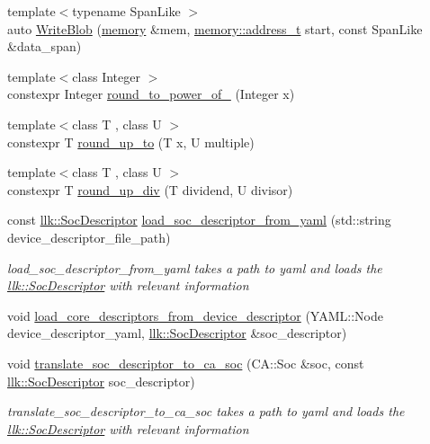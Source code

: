 \begin{DoxyCompactItemize}
\item 
{\footnotesize template$<$typename Span\+Like $>$ }\\auto \hyperlink{namespacellk_a03eaff131f928d8e762175c51ced8fb9}{Write\+Blob} (\hyperlink{classllk_1_1memory}{memory} \&mem, \hyperlink{classllk_1_1memory_ae7a4b897aa999f22e250dc8e4d773dec}{memory\+::address\+\_\+t} start, const Span\+Like \&data\+\_\+span)
\item 
{\footnotesize template$<$class Integer $>$ }\\constexpr Integer \hyperlink{namespacellk_a8cd09709764d84271aa30cbbdbc8c7dd}{round\+\_\+to\+\_\+power\+\_\+of\+\_} (Integer x)
\item 
{\footnotesize template$<$class T , class U $>$ }\\constexpr T \hyperlink{namespacellk_a4d91d6fe231ded1b2eb55d3b804b5da1}{round\+\_\+up\+\_\+to} (T x, U multiple)
\item 
{\footnotesize template$<$class T , class U $>$ }\\constexpr T \hyperlink{namespacellk_a3556f6edf607e08801e2cba0f809d09d}{round\+\_\+up\+\_\+div} (T dividend, U divisor)
\item 
const \hyperlink{structllk_1_1SocDescriptor}{llk\+::\+Soc\+Descriptor} \hyperlink{namespacellk_af288472eef4153c0c2592b87940d7e9a}{load\+\_\+soc\+\_\+descriptor\+\_\+from\+\_\+yaml} (std\+::string device\+\_\+descriptor\+\_\+file\+\_\+path)
\begin{DoxyCompactList}\small\item\em load\+\_\+soc\+\_\+descriptor\+\_\+from\+\_\+yaml takes a path to yaml and loads the \hyperlink{structllk_1_1SocDescriptor}{llk\+::\+Soc\+Descriptor} with relevant information \end{DoxyCompactList}\item 
void \hyperlink{namespacellk_aba61403c3cbb47767fd66634401ca1ad}{load\+\_\+core\+\_\+descriptors\+\_\+from\+\_\+device\+\_\+descriptor} (Y\+A\+M\+L\+::\+Node device\+\_\+descriptor\+\_\+yaml, \hyperlink{structllk_1_1SocDescriptor}{llk\+::\+Soc\+Descriptor} \&soc\+\_\+descriptor)
\item 
void \hyperlink{namespacellk_a15c1d720bf035c008aea9ba25a7150eb}{translate\+\_\+soc\+\_\+descriptor\+\_\+to\+\_\+ca\+\_\+soc} (C\+A\+::\+Soc \&soc, const \hyperlink{structllk_1_1SocDescriptor}{llk\+::\+Soc\+Descriptor} soc\+\_\+descriptor)
\begin{DoxyCompactList}\small\item\em translate\+\_\+soc\+\_\+descriptor\+\_\+to\+\_\+ca\+\_\+soc takes a path to yaml and loads the \hyperlink{structllk_1_1SocDescriptor}{llk\+::\+Soc\+Descriptor} with relevant information \end{DoxyCompactList}\item 

\end{DoxyCompactItemize}
